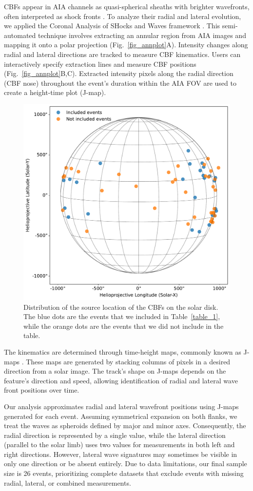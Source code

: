 CBFs appear in AIA channels as quasi-spherical sheaths with brighter wavefronts, often interpreted as shock fronts \citep{vourlidas_2003, ontiveros_2009, kozarev_2011, ma_2011}.
To analyze their radial and lateral evolution, we applied the Coronal Analysis of SHocks and Waves framework \citep[CASHeW]{kozarev_2017}. This semi-automated technique involves extracting an annular region from AIA images and mapping it onto a polar projection (Fig.~\ref{fig_annplot}A). Intensity changes along radial and lateral directions are tracked to measure CBF kinematics. Users can interactively specify extraction lines and measure CBF positions (Fig.~\ref{fig_annplot}B,C). Extracted intensity pixels along the radial direction (CBF nose) throughout the event's duration within the AIA FOV are used to create a height-time plot (J-map).

\begin{figure}[!htp] %
	\centerline{\includegraphics[width=0.7\columnwidth]{chapter2/figs/events_coords.pdf}}
	\caption{Distribution of the source location of the CBFs on the solar disk. The blue dots are the events that we included in Table~\ref{table_1}, while the orange dots are the events that we did not include in the table.}
	\label{fig_solardisk}
\end{figure}

The kinematics are determined through time-height maps, commonly known as J-maps \citep{sheeley_1999}. These maps are generated by stacking columns of pixels in a desired direction from a solar image. The track's shape on J-maps depends on the feature's direction and speed, allowing identification of radial and lateral wave front positions over time. 

Our analysis approximates radial and lateral wavefront positions using J-maps generated for each event. Assuming symmetrical expansion on both flanks, we treat the waves as spheroids defined by major and minor axes. Consequently, the radial direction is represented by a single value, while the lateral direction (parallel to the solar limb) uses two values for measurements in both left and right directions. However, lateral wave signatures may sometimes be visible in only one direction or be absent entirely.
Due to data limitations, our final sample size is 26 events, prioritizing complete datasets that exclude events with missing radial, lateral, or combined measurements.

